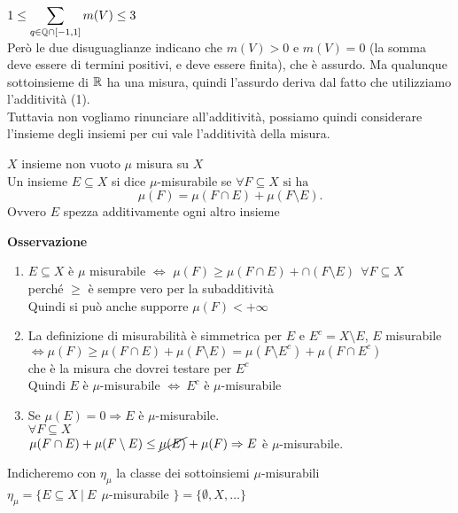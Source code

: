 \documentclass{article}
\begin{document}
	  $\displaystyle 1 \leq \sum^{}_{q\in\mathbb{Q}\cap[-1,1]}m(V)\leq 3$ \\
	  Però le due disuguaglianze indicano che $m(V) > 0$ e $m(V) = 0$ (la somma deve essere di termini positivi, e deve essere finita), che è assurdo. Ma qualunque sottoinsieme di $\mathbb{R}$ ha una misura, quindi l'assurdo deriva dal fatto che utilizziamo l'additività (1).\\[10px]
	  Tuttavia non vogliamo rinunciare all'additività, possiamo quindi considerare l'insieme degli insiemi per cui vale l'additività della misura.\\
	  \begin{defi}[Caratheodory]
	  	$X$ insieme non vuoto $\mu$ misura su $X$\\
		Un insieme  $E\subseteq X$ si dice $\mu$-misurabile se $\forall F\subseteq X \text { si ha }$
		\[
			 \mu(F) = \mu(F\cap E) + \mu(F\setminus E) 
		.\] 
		Ovvero $E$ spezza additivamente ogni altro insieme
	  \end{defi}
	  \textbf{Osservazione}\\
	  \begin{enumerate}
		  \item $E\subseteq X$ è  $\mu$ misurabile $ \Leftrightarrow$ $\mu(F)\geq \mu(F\cap E) + \cap (F\setminus E) \ \ \forall F\subseteq X$\\
			  perché $\geq$ è sempre vero per la subadditività\\
			  Quindi si può anche supporre $\mu(F)< + \infty$
		  \item La definizione di misurabilità è simmetrica per  $E$ e $E^c = X\setminus E$,  $E$ misurabile $ \Leftrightarrow\mu(F)\geq \mu(F\cap E) + \mu (F\setminus E) = \mu(F\setminus E^c) + \mu(F\cap E^c)$\\
			  che è la misura che dovrei testare per $E^c$ \\
			  Quindi $E$ è $\mu$-misurabile $ \Leftrightarrow \ E^c$ è $\mu$-misurabile
		  \item Se $\mu(E) = 0  \Rightarrow  E $ è $\mu$-misurabile.\\
			  $\forall F\subseteq X$\\
			  $\mu(F\cap E)+ \mu(F\setminus E)\leq \cancel{\mu(E)} + \mu(F) \Rightarrow E$ è $\mu$-misurabile.\\
	  \end{enumerate}
			  Indicheremo con $\eta_\mu$ la classe dei sottoinsiemi  $\mu$-misurabili\\
			  $\eta_\mu = \{E\subseteq X \ | \ E \ \ \mu$-misurabile $\} = \{\emptyset, X, \ldots\}$
\end{document}
